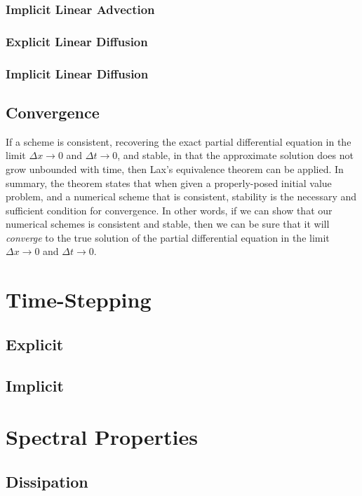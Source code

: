 \subsection{Implicit Linear Advection}

\subsection{Explicit Linear Diffusion}

\subsection{Implicit Linear Diffusion}

\section{Convergence}
If a scheme is consistent, recovering the exact partial differential equation in the limit $\Delta x \rightarrow 0$ and $\Delta t \rightarrow 0$, and stable, in that the approximate solution does not grow unbounded with time, then Lax's equivalence theorem can be applied. In summary, the theorem states that when given a properly-posed initial value problem, and a numerical scheme that is consistent, stability is the necessary and sufficient condition for convergence. In other words, if we can show that our numerical schemes is consistent and stable, then we can be sure that it will {\it converge} to the true solution of the partial differential equation in the limit $\Delta x \rightarrow 0$ and $\Delta t \rightarrow 0$.

\chapter{Time-Stepping}
\section{Explicit}
\section{Implicit}

\chapter{Spectral Properties}
\section{Dissipation}
